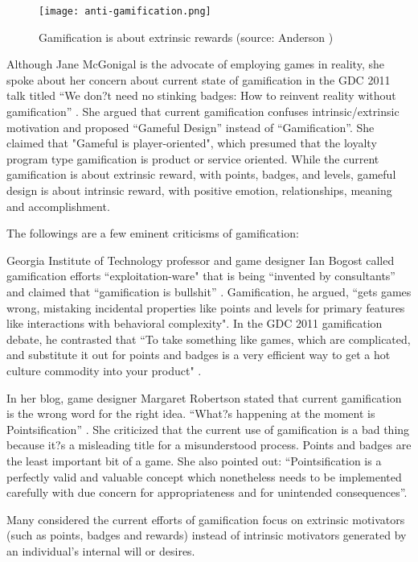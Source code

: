 \begin{figure}[htbp]
	\centering
		\texttt{[image: anti-gamification.png]}
		\caption{Gamification is about extrinsic rewards (source: Anderson \cite {anderson2011})}
		\label{fig:anti-gamification}
\end{figure}

Although Jane McGonigal is the advocate of employing games in reality, she spoke about her concern about current state of gamification in the GDC 2011 talk titled ``We don?t need no stinking badges: How to reinvent reality without gamification'' \cite {mcgonigal2011}. She argued that current gamification confuses intrinsic/extrinsic motivation and proposed ``Gameful Design'' instead of ``Gamification''. She claimed that "Gameful is player-oriented", which presumed that the loyalty program type gamification is product or service oriented. While the current gamification is about extrinsic reward, with points, badges, and levels, gameful design is about intrinsic reward, with positive emotion, relationships, meaning and accomplishment.

The followings are a few eminent criticisms of gamification:

Georgia Institute of Technology professor and game designer Ian Bogost called gamification efforts ``exploitation-ware" that is being ``invented by consultants'' and claimed that ``gamification is bullshit'' \cite {bogost}. Gamification, he argued, ``gets games wrong, mistaking incidental properties like points and levels for primary features like interactions with behavioral complexity". In the GDC 2011 gamification debate, he contrasted that ``To take something like games, which are complicated, and substitute it out for points and badges is a very efficient way to get a hot culture commodity into your product" \cite {magrino2011}.

In her blog, game designer Margaret Robertson stated that current gamification is the wrong word for the right idea. ``What?s happening at the moment is Pointsification'' \cite {robertson2010}. She criticized that
the current use of gamification is a bad thing because it?s a misleading title for a misunderstood process. Points and badges are the least important bit of a game. She also pointed out: ``Pointsification is a perfectly valid and valuable concept which nonetheless needs to be implemented carefully with due concern for appropriateness and for unintended consequences''.

Many considered the current efforts of gamification focus on extrinsic motivators (such as points, badges and rewards) instead of intrinsic motivators generated by an individual's internal will or desires.

